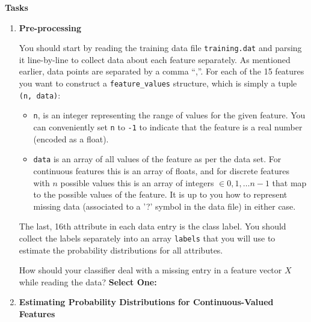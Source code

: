 \textbf{Tasks} 
\begin{enumerate}
    \item \textbf{Pre-processing} 
    
    You should start by reading the training data file {\tt training.dat} and parsing it line-by-line to collect data about each feature separately. As mentioned earlier, data points are separated by a comma ``,''. For each of the 15 features you want to construct a \texttt{feature\_values} structure, which is simply a tuple \texttt{(n, data)}:
    \begin{itemize}
        \item \texttt{n}, is an integer representing the range of values for the given feature. You can conveniently set \texttt{n} to \texttt{-1} to indicate that the feature is a real number (encoded as a float).
        \item \texttt{data} is an array of all values of the feature as per the data set. For continuous features this is an array of floats, and for discrete features with $n$ possible values this is an array of integers $\in {0,1,\ldots n-1}$ that map to the possible values of the feature. It is up to you how to represent missing data (associated to a '?' symbol in the data file) in either case. 
    \end{itemize}
    
    The last, 16th attribute in each data entry is the class label. You should collect the labels separately into an array \texttt{labels} that you will use to estimate the probability distributions for all attributes. 
    
    \pagebreak
     How should your classifier deal with a missing entry in a feature vector $X$ while reading the data?
    \textbf{Select One:}
    
    
    \item \textbf{Estimating Probability Distributions for Continuous-Valued Features}
    

\end{enumerate}
